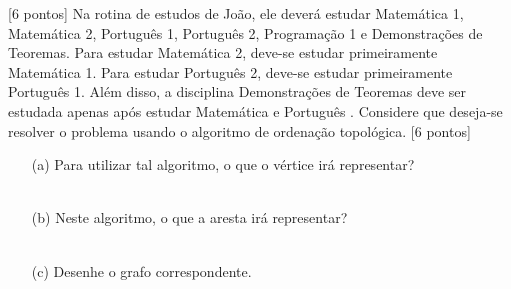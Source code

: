 \documentclass[16pt]{examdesign}
\begin{document}
\begin{fillin}[title={},
                    rearrange=no,resetcounter=no,suppressprefix]
\begin{question}
\pagebreak


\pagebreak
\end{question}
     \begin{question}
    
[6 pontos] Na rotina de estudos de João, ele deverá estudar Matemática 1, Matemática 2, Português 1, Português 2, Programação 1 e Demonstrações de Teoremas. 
Para estudar Matemática 2, deve-se estudar primeiramente Matemática 1. Para estudar Português 2, deve-se estudar primeiramente Português 1.
Além disso, a disciplina Demonstrações de Teoremas deve ser estudada apenas após estudar Matemática  e Português . Considere que deseja-se resolver o problema usando o algoritmo de ordenação topológica. [6 pontos]

	  \begin{itemize}
		  \item[(a)] Para utilizar tal algoritmo, o que o vértice irá representar?\\~\\ \blank{~~~~~~~~~~~~~~~~~~~~~~~~~~~~~~~~~~~~~~~~~~~~~~~~~~~~~~~~~~~~~~~~~~~~~~~~~~~~~~~~~~~~~~~~~~~~~~~~~~~~~~~~~~~~~~~~~~~~~~~~~~~~~~~~~~~~~~~~~~~~~~~~~~~~~~~~}
		  \item[(b)] Neste algoritmo, o que a aresta irá representar?\\~\\
		  \blank{~~~~~~~~~~~~~~~~~~~~~~~~~~~~~~~~~~~~~~~~~~~~~~~~~~~~~~~~~~~~~~~~~~~~~~~~~~~~~~~~~~~~~~~~~~~~~~~~~~~~~~~~~~~~~~~~~~~~~~~~~~~~~~~~~~~~~~~~~~~~~~~~~~~~~~~~}
		  \item[(c)] Desenhe o grafo correspondente.
		  ~\\
		  ~\\
		  ~\\
		  ~\\
		  ~\\
		  ~\\
		  ~\\
		  ~\\
		  ~\\
		  ~\\		  ~\\
		  ~\\
		 

\end{itemize}
\end{question}
\end{fillin}
\end{document}
